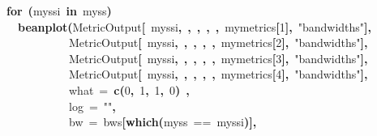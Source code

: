 \documentclass{article}
\makeatletter
\newcommand{\hlnumber}[1]{\textcolor[rgb]{0,0,0}{#1}}%
\newcommand{\hlfunctioncall}[1]{\textcolor[rgb]{0.501960784313725,0,0.329411764705882}{\textbf{#1}}}%
\newcommand{\hlstring}[1]{\textcolor[rgb]{0.6,0.6,1}{#1}}%
\newcommand{\hlkeyword}[1]{\textcolor[rgb]{0,0,0}{\textbf{#1}}}%
\newcommand{\hlargument}[1]{\textcolor[rgb]{0.690196078431373,0.250980392156863,0.0196078431372549}{#1}}%
\newcommand{\hlsymbol}[1]{\textcolor[rgb]{0,0,0}{#1}}%
\newcommand{\hlstd}[1]{\textcolor[rgb]{0,0,0}{#1}}%
\newenvironment{kframe}{%
 \def\FrameCommand##1{\hskip\@totalleftmargin \hskip-\fboxsep
 \colorbox{shadecolor}{##1}\hskip-\fboxsep
     \hskip-\linewidth \hskip-\@totalleftmargin \hskip\columnwidth}%
 \MakeFramed {\advance\hsize-\width
   \@totalleftmargin\z@ \linewidth\hsize
   \@setminipage}}%
 {\par\unskip\endMakeFramed}
\newenvironment{knitrout}{}{} %
\makeatother
\begin{document}
\begin{knitrout}
\begin{kframe}
\begin{flushleft}
\hlstd{}\hlkeyword{for}{\ }\hlkeyword{(}\hlsymbol{myssi}{\ }\hlkeyword{in}{\ }\hlsymbol{myss}\hlkeyword{)}{\ }\hlkeyword{\usebox{\hlnormalsizeboxopenbrace}}\hspace*{\fill}\\
\hlstd{}{\ }{\ }\hlfunctioncall{beanplot}\hlkeyword{(}\hlsymbol{MetricOutput}\hlkeyword{[}{\ }\hlsymbol{myssi}\hlkeyword{,}{\ }\hlkeyword{,}{\ }\hlkeyword{,}{\ }\hlkeyword{,}{\ }\hlkeyword{,}{\ }\hlsymbol{mymetrics}\hlkeyword{[}\hlnumber{1}\hlkeyword{]}\hlkeyword{,}{\ }\hlstring{"{}bandwidths"{}}\hlkeyword{]}\hlkeyword{,}\hspace*{\fill}\\
\hlstd{}{\ }{\ }{\ }{\ }{\ }{\ }{\ }{\ }{\ }{\ }{\ }\hlsymbol{MetricOutput}\hlkeyword{[}{\ }\hlsymbol{myssi}\hlkeyword{,}{\ }\hlkeyword{,}{\ }\hlkeyword{,}{\ }\hlkeyword{,}{\ }\hlkeyword{,}{\ }\hlsymbol{mymetrics}\hlkeyword{[}\hlnumber{2}\hlkeyword{]}\hlkeyword{,}{\ }\hlstring{"{}bandwidths"{}}\hlkeyword{]}\hlkeyword{,}\hspace*{\fill}\\
\hlstd{}{\ }{\ }{\ }{\ }{\ }{\ }{\ }{\ }{\ }{\ }{\ }\hlsymbol{MetricOutput}\hlkeyword{[}{\ }\hlsymbol{myssi}\hlkeyword{,}{\ }\hlkeyword{,}{\ }\hlkeyword{,}{\ }\hlkeyword{,}{\ }\hlkeyword{,}{\ }\hlsymbol{mymetrics}\hlkeyword{[}\hlnumber{3}\hlkeyword{]}\hlkeyword{,}{\ }\hlstring{"{}bandwidths"{}}\hlkeyword{]}\hlkeyword{,}\hspace*{\fill}\\
\hlstd{}{\ }{\ }{\ }{\ }{\ }{\ }{\ }{\ }{\ }{\ }{\ }\hlsymbol{MetricOutput}\hlkeyword{[}{\ }\hlsymbol{myssi}\hlkeyword{,}{\ }\hlkeyword{,}{\ }\hlkeyword{,}{\ }\hlkeyword{,}{\ }\hlkeyword{,}{\ }\hlsymbol{mymetrics}\hlkeyword{[}\hlnumber{4}\hlkeyword{]}\hlkeyword{,}{\ }\hlstring{"{}bandwidths"{}}\hlkeyword{]}\hlkeyword{,}\hspace*{\fill}\\
\hlstd{}{\ }{\ }{\ }{\ }{\ }{\ }{\ }{\ }{\ }{\ }{\ }\hlargument{what}{\ }\hlargument{=}{\ }\hlfunctioncall{c}\hlkeyword{(}\hlnumber{0}\hlkeyword{,}{\ }\hlnumber{1}\hlkeyword{,}{\ }\hlnumber{1}\hlkeyword{,}{\ }\hlnumber{0}\hlkeyword{)}{\ }\hlkeyword{,}\hspace*{\fill}\\
\hlstd{}{\ }{\ }{\ }{\ }{\ }{\ }{\ }{\ }{\ }{\ }{\ }\hlargument{log}{\ }\hlargument{=}{\ }\hlstring{"{}"{}}\hlkeyword{,}\hspace*{\fill}\\
\hlstd{}{\ }{\ }{\ }{\ }{\ }{\ }{\ }{\ }{\ }{\ }{\ }\hlargument{bw}{\ }\hlargument{=}{\ }\hlsymbol{bws}\hlkeyword{[}\hlfunctioncall{which}\hlkeyword{(}\hlsymbol{myss}{\ }=={\ }\hlsymbol{myssi}\hlkeyword{)}\hlkeyword{]}\hlkeyword{,}\hspace*{\fill}\\

\end{flushleft}
\end{kframe}
\end{knitrout}
\end{document}
